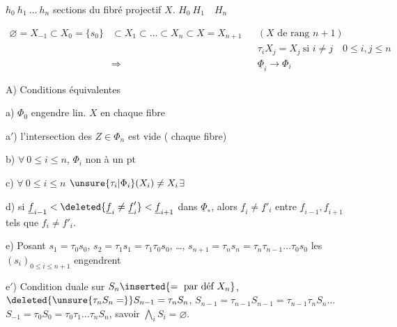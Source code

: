 
 $h_0\ h_1\ \ldots\ h_n$ sections du fibré projectif $X$. $H_0\ H_1\quad H_n$  


\[
\begin{aligned}
\varnothing=X_{-1}\subset X_0=\{s_0\}&\subset X_1\subset\ldots\subset X_n\subset X=X_{n+1}
 & & (X\text{ de rang }n+1)\\
&&&\tau_i X_j=X_j\ \text{si }i\ne j\quad 0\leq i,j\leq n\\
&\Longrightarrow &&\underline\Phi_i\longrightarrow\Phi_i
\end{aligned}
\]

A) Conditions équivalentes


a) $\Phi_0$ engendre lin. $X$ en chaque fibre

a$'$) l'intersection des $Z\in\Phi_n$ est vide (  chaque fibre)

b) $\forall\ 0\leq i\leq n$, $\Phi_i$ non  à un pt

c) $\forall\ 0\leq i\leq n$ $\unsure{\tau_i|\Phi_i}(X_i)\ne X_i$\qquad $\exists$

d) si $\underline f_{i-1}<\deleted{\underline f_i\ne\underline f'_i}<\underline f_{i+1}$ dans $\underline\Phi_*$, alors $\underline f_i\ne\underline f'_i$ entre $\underline f_{i-1},\underline f_{i+1}$ tels que $f_i\ne f'_i$.

e) Posant $s_1=\tau_0 s_0$, $s_2=\tau_1s_1=\tau_1\tau_0s_0$, \ldots, $s_{n+1}=\tau_ns_n=\tau_n\tau_{n-1}\ldots\tau_0s_0$ les $(s_i)_{0\leq i\leq n+1}$ engendrent  

e$'$) Condition duale sur $S_n\inserted{=\text{ par déf }X_n}$, $\deleted{\unsure{\tau_n S_n=}}S_{n-1}=\tau_n S_n$, $S_{n-1}=\tau_{n-1}S_{n-1}=\tau_{n-1}\tau_n S_n\ldots$ $S_{-1}=\tau_0S_0=\tau_0\tau_1\ldots\tau_n S_n$, savoir $\bigwedge_i S_i=\varnothing$.

